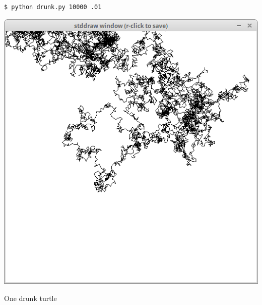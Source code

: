 \documentclass[8pt,a4paper,compress,handout]{beamer}
\begin{document}
\begin{frame}[fragile]
\begin{minipage}{200pt}
\begin{lstlisting}[language={}]
$ python drunk.py 10000 .01
\end{lstlisting}
\end{minipage}%
\hfill
\begin{minipage}{100pt}
\begin{center}
\includegraphics[scale=0.2]{figures/drunk.png}

\smallskip

\tiny One drunk turtle
\end{center}
\end{minipage}
\end{frame}
\end{document}
